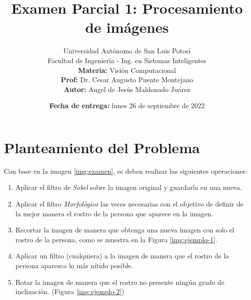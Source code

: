 \documentclass[12pt, a4paper]{article}
\title{\vspace{-3cm}Examen Parcial 1: Procesamiento de imágenes}
\author{
    Universidad Autónoma de San Luis Potosí\\
    Facultad de Ingeniería - Ing. en Sistemas Inteligentes\\
    \textbf{Materia:} Visión Computacional\\
    \textbf{Prof:} Dr. Cesar Augusto Puente Montejano\\
    \textbf{Autor:} Angel de Jesús Maldonado Juárez
}
\date{\textbf{Fecha de entrega:} lunes 26 de septiembre de 2022}
\begin{document}
\maketitle

\section{Planteamiento del Problema}\label{Planteamiento}
Con base en la imagen \ref{img:examen}, se deben realizar las siguientes operaciones:

\begin{enumerate}[label=\alph*)]
    \item Aplicar el filtro de \emph{Sobel} sobre la imagen original y guardarla en una nueva.
    \item Aplicar el filtro \emph{Morfológico } las veces necesarias con el objetivo de definir de la mejor manera el rostro de la persona que aparece en la imagen.
    \item Recortar la imagen de manera que obtenga una nueva imagen con solo el rostro de la persona, como se muestra en la Figura \ref{img:ejemplo-1}.
    \item Aplicar un filtro (cualquiera) a la imagen de manera que el rostro de la persona aparezca lo más nítido posible.
    \item Rotar la imagen de manera que el rostro no presente ningún grado de inclinación. (Figura \ref{img:ejemplo-2})
\end{enumerate}
\end{document}
